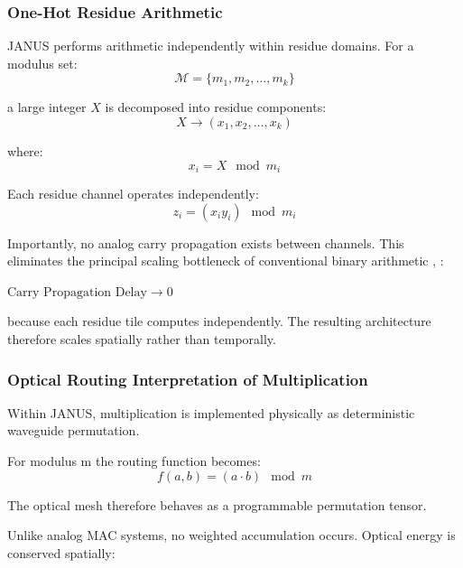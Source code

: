 \documentclass[journal]{IEEEtran}
\begin{document}
\subsubsection{\textbf{One-Hot Residue Arithmetic}}

 JANUS performs arithmetic independently within residue domains.
For a modulus set:
\begin{equation}
\mathcal{M} = \{m_1, m_2, \dots, m_k\}
\label{eq:modulus_set}
\end{equation}

a large integer $X$ is decomposed into residue components:
\begin{equation}
X \rightarrow (x_1, x_2, \dots, x_k)
\end{equation}

where:
\begin{equation}
x_i = X \mod m_i
\label{eq:residue_projection}
\end{equation}

Each residue channel operates independently:
\begin{equation}
z_i = (x_iy_i) \mod m_i
\label{eq:modular_product}
\end{equation}

Importantly, no analog carry propagation exists between channels. This eliminates the principal scaling bottleneck of conventional binary arithmetic \cite{Omosanya2021}, \cite{Mohan2016}:

\begin{center}
$\text{Carry Propagation Delay} \rightarrow 0$
\end{center}

because each residue tile computes independently.
The resulting architecture therefore scales spatially rather than temporally.

\subsubsection{\textbf{Optical Routing Interpretation of Multiplication}}
Within JANUS, multiplication is implemented physically as deterministic waveguide permutation.

For modulus m the routing function becomes:
\begin{equation}
f (a, b) = (a \cdot b) \mod m
\end{equation}

The optical mesh therefore behaves as a programmable permutation tensor.

Unlike analog MAC systems, no weighted accumulation occurs. Optical energy is conserved spatially:
\end{document}
